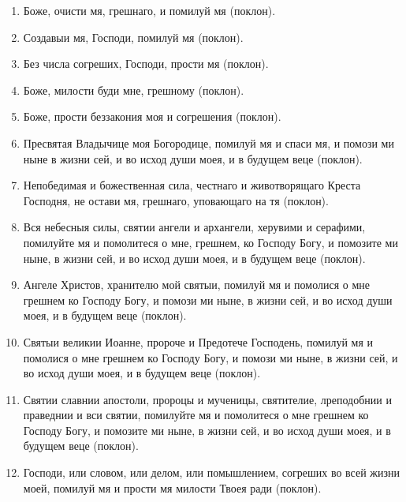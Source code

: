 \begin{enumerate}

\item Боже, очисти мя, грешнаго, и помилуй мя (поклон).

\item Создавыи мя, Господи, помилуй мя (поклон).

\item Без числа согреших, Господи, прости мя (поклон).

\item Боже, милости буди мне, грешному (поклон).

\item Боже, прости беззакония моя и согрешения (поклон).

\item Пресвятая Владычице моя Богородице, помилуй мя и спаси мя, и помози ми ныне в жизни сей, и во исход души моея, и в будущем веце (поклон).

\item Непобедимая и божественная сила, честнаго и животворящаго Креста Господня, не остави мя, грешнаго, уповающаго на тя (поклон).

\item Вся небесныя силы, святии ангели и архангели, херувими и серафими, помилуйте мя и помолитеся о мне, грешнем, ко Господу Богу, и помозите ми ныне, в жизни сей, и во исход души моея, и в будущем веце (поклон).

\item Ангеле Христов, хранителю мой святыи, помилуй мя и помолися о мне грешнем ко Господу Богу, и помози ми ныне, в жизни сей, и во исход души моея, и в будущем веце (поклон).

\item Святыи великии Иоанне, пророче и Предотече Господень, помилуй мя и помолися о мне грешнем ко Господу Богу, и помози ми ныне, в жизни сей, и во исход души моея, и в будущем веце (поклон).

\item Святии славнии апостоли, пророцы и мученицы, святителие, лреподобнии и праведнии и вси святии, помилуйте мя и помолитеся о мне грешнем ко Господу Богу, и помозите ми ныне, в жизни сей, и во исход души моея, и в будущем веце (поклон).

\item Господи, или словом, или делом, или помышлением, согреших во всей жизни моей, помилуй мя и прости мя милости Твоея ради (поклон).

\end{enumerate}

